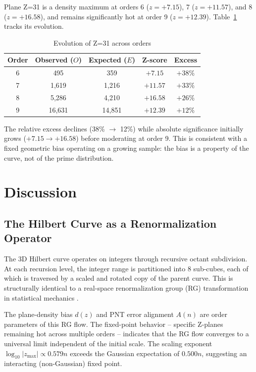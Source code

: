 \documentclass[11pt,a4paper]{article}
\begin{document}
Plane Z=31 is a density maximum at orders 6 ($z=+7.15$), 7 ($z=+11.57$),
and 8 ($z=+16.58$), and remains significantly hot at order 9 ($z=+12.39$).
Table~\ref{tab:z31} tracks its evolution.

\begin{table}[h]
\centering
\caption{Evolution of Z=31 across orders}
\label{tab:z31}
\begin{tabular}{ccccc}
\toprule
Order & Observed ($O$) & Expected ($E$) & Z-score & Excess \\
\midrule
6 & 495     & 359     & $+7.15$  & $+38\%$ \\
7 & 1,619   & 1,216   & $+11.57$ & $+33\%$ \\
8 & 5,286   & 4,210   & $+16.58$ & $+26\%$ \\
9 & 16,631  & 14,851  & $+12.39$ & $+12\%$ \\
\bottomrule
\end{tabular}
\end{table}

The relative excess declines (38\% $\to$ 12\%) while absolute significance
initially grows ($+7.15 \to +16.58$) before moderating at order 9.
This is consistent with a fixed geometric bias operating on a growing
sample: the bias is a property of the curve, not of the prime distribution.

\section{Discussion}

\subsection{The Hilbert Curve as a Renormalization Operator}

The 3D Hilbert curve operates on integers through recursive octant
subdivision. At each recursion level, the integer range is partitioned
into 8 sub-cubes, each of which is traversed by a scaled and rotated copy
of the parent curve. This is structurally identical to a real-space
renormalization group (RG) transformation in statistical mechanics
\cite{wilson1971}.

The plane-density bias $d(z)$ and PNT error alignment $A(n)$ are order
parameters of this RG flow. The fixed-point behavior -- specific Z-planes
remaining hot across multiple orders -- indicates that the RG flow
converges to a universal limit independent of the initial scale. The
scaling exponent $\log_{10}|z_{\max}| \propto 0.579n$ exceeds the Gaussian
expectation of $0.500n$, suggesting an interacting (non-Gaussian) fixed
point.
\end{document}
